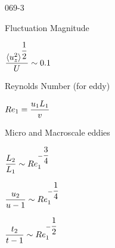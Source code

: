 \begin{mitframe}{069-3} %

        
\begin{listone}

\item Fluctuation Magnitude

		\begin {listtwo}
		\item $\dfrac{\langle\forcepot_{z}^2\rangle^{\dfrac{1}{2}}}{\uvel}\sim{0.1}$
       \end{listtwo}
        
\item Reynolds Number (for eddy)

		\begin{listtwo}
       \item $\reynolds_1=\dfrac{\forcepot_1\length_1}{\vvel}$
        
\end{listtwo}
\item Micro and Macroscale eddies

		\begin{listtwo}
        
        \item $\dfrac{\length_2}{\length_1}\sim\reynolds_1^{-\dfrac{3}{4}}$
        
        
        \item $\dfrac{\forcepot_2}{\forcepot-1}\sim\reynolds_1^{-\dfrac{1}{4}}$
        
        \item $\dfrac{t_2}{t-1}\sim\reynolds_1^{-\dfrac{1}{2}}$
        

\end{listtwo}
\end{listone}

\end{mitframe}